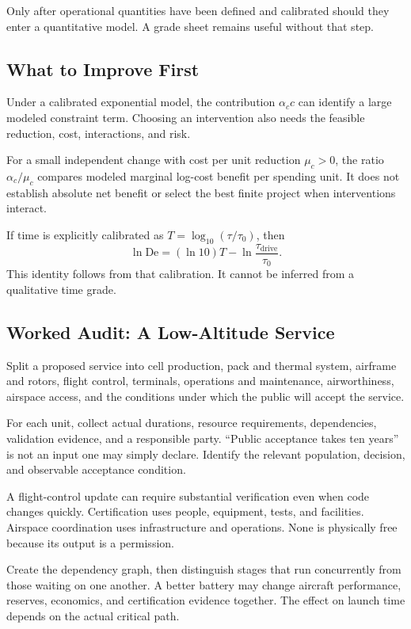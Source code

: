 \documentclass[11pt,openany]{book}
\begin{document}
Only after operational quantities have been defined and calibrated should they enter a quantitative model. A grade sheet remains useful without that step.

\subsection{What to Improve First}

Under a calibrated exponential model, the contribution $\alpha_c c$ can identify a large modeled constraint term. Choosing an intervention also needs the feasible reduction, cost, interactions, and risk.

For a small independent change with cost per unit reduction $\mu_c>0$, the ratio $\alpha_c/\mu_c$ compares modeled marginal log-cost benefit per spending unit. It does not establish absolute net benefit or select the best finite project when interventions interact.

If time is explicitly calibrated as $T=\log_{10}(\tau/\tau_0)$, then
\begin{equation}
 \ln\mathrm{De}=(\ln10)T
 -\ln\frac{\tau_{\mathrm{drive}}}{\tau_0}.
\end{equation}
This identity follows from that calibration. It cannot be inferred from a qualitative time grade.

\subsection{Worked Audit: A Low-Altitude Service}

Split a proposed service into cell production, pack and thermal system, airframe and rotors, flight control, terminals, operations and maintenance, airworthiness, airspace access, and the conditions under which the public will accept the service.

For each unit, collect actual durations, resource requirements, dependencies, validation evidence, and a responsible party. “Public acceptance takes ten years” is not an input one may simply declare. Identify the relevant population, decision, and observable acceptance condition.

A flight-control update can require substantial verification even when code changes quickly. Certification uses people, equipment, tests, and facilities. Airspace coordination uses infrastructure and operations. None is physically free because its output is a permission.

Create the dependency graph, then distinguish stages that run concurrently from those waiting on one another. A better battery may change aircraft performance, reserves, economics, and certification evidence together. The effect on launch time depends on the actual critical path.
\end{document}
